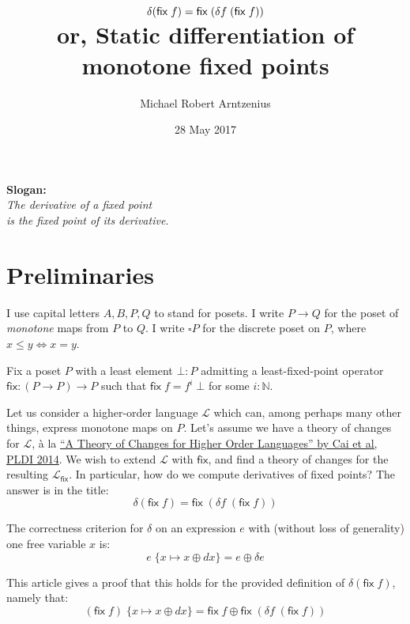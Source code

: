 \documentclass[a5,libertine]{rntz}
\title{$\dv(\fix\;f) = \fix\;(\dv{f} \; (\fix\;f))$
\\
\large or, Static differentiation of monotone fixed points}
\author{Michael Robert Arntzenius}
\date{28 May 2017}
\newcommand{\ms}[1]{\ensuremath{\mathsf{#1}}}
\newcommand{\mc}[1]{\ensuremath{\mathcal{#1}}}
\newcommand{\N}{\mathbb{N}}
\newcommand{\sub}[1]{\;\{{#1}\}}
\newcommand{\Disc}[1]{\square{#1}}
\newcommand{\fix}{\ms{fix}}
\newcommand{\dv}{\delta}
\begin{document}
\maketitle

\begin{center}
  \large
  \textbf{Slogan:}\\
  \it The derivative of a fixed point\\
  is the fixed point of its derivative.
\end{center}

\section{Preliminaries}

I use capital letters $A, B, P, Q$ to stand for posets. I write $P \to Q$ for
the poset of \emph{monotone} maps from $P$ to $Q$. I write $\Disc{P}$ for the
discrete poset on $P$, where $x \le y \iff x = y$.

Fix a poset $P$ with a least element $\bot : P$ admitting a least-fixed-point
operator $\fix : (P \to P) \to P$ such that $\fix\;f = f^i\;\bot$ for some $i :
\N$.

Let us consider a higher-order language $\mc{L}$ which can, among perhaps many
other things, express monotone maps on $P$. Let's assume we have a theory of
changes for $\mc{L}$, \`a la \href{https://arxiv.org/abs/1312.0658}{``A Theory of
  Changes for Higher Order Languages'' by Cai et al, PLDI 2014}. We wish to
extend $\mc{L}$ with $\fix$, and find a theory of changes for the resulting
$\mc{L}_\fix$. In particular, how do we compute derivatives of fixed points? The
answer is in the title:
\[ \dv(\fix\;f) = \fix\;(\dv{f} \; (\fix\;f)) \]


The correctness criterion for $\dv$ on an expression $e$ with (without loss of
generality) one free variable $x$ is:
\begin{equation}
  e \sub{x \mapsto x \oplus dx} = e \oplus \dv e
  \label{eqn:correctness}
\end{equation}

This article gives a proof that this holds for the provided definition of
$\dv(\fix\;f)$, namely that:
\[ (\fix\;f) \sub{x \mapsto x \oplus dx} = \fix\;f \oplus \fix\;(\dv f \; (\fix\;f)) \]
\end{document}
